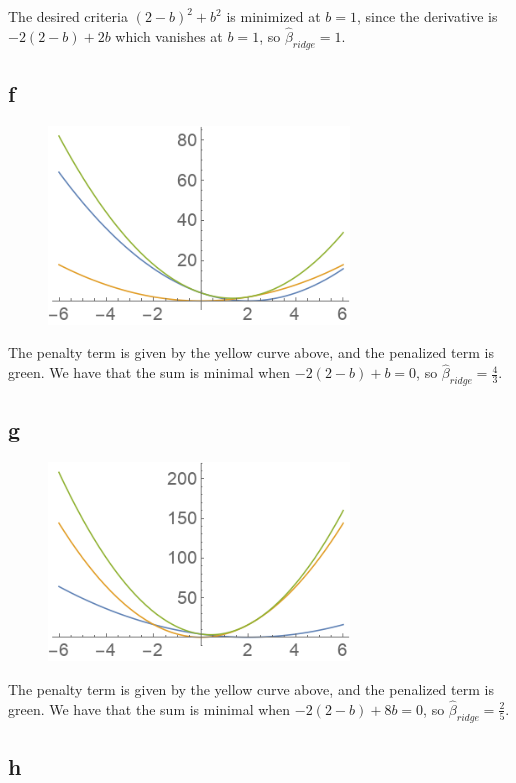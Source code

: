 \documentclass[12pt,letterpaper]{article}
\theoremstyle{definition}
\begin{document}
The desired criteria $(2 - b)^{2} + b^{2}$ is minimized at $b = 1$, since the derivative is $-2(2 - b) + 2b$ which vanishes at $b = 1$, so $\hat{\beta}_{ridge} = 1$.

\subsection*{f}

\begin{figure}[H]
  \centering
  \includegraphics[width=8cm]{plot2.png}
\end{figure}

The penalty term is given by the yellow curve above, and the penalized term is green. We have that the sum is minimal when $-2(2 - b) + b = 0$, so $\hat{\beta}_{ridge} = \frac{4}{3}$.

\subsection*{g}

\begin{figure}[H]
  \centering
  \includegraphics[width=8cm]{plot3.png}
\end{figure}

The penalty term is given by the yellow curve above, and the penalized term is green. We have that the sum is minimal when $-2(2 - b) + 8b = 0$, so $\hat{\beta}_{ridge} = \frac{2}{5}$.

\subsection*{h}
\end{document}

